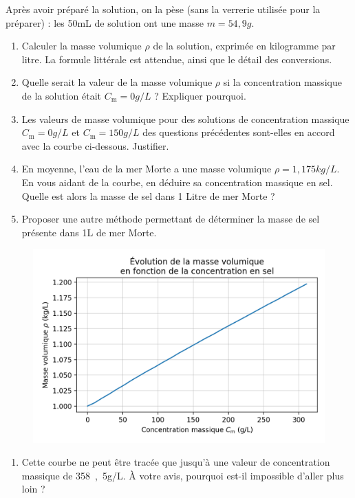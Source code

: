 Après avoir préparé la solution, on la pèse (sans la verrerie utilisée pour la préparer) : les \unit{50}{mL} de solution ont une masse $m=\unit{54{,}9}{g}$.
\begin{enumerate}[resume]
\item Calculer la masse volumique $\rho$ de la solution, exprimée en kilogramme par litre.
La formule littérale est attendue, ainsi que le détail des conversions.
\item Quelle serait la valeur de la masse volumique $\rho$ si la concentration massique de la solution était $C_\mathrm{m} = \unit{0}{g/L}$ ?
Expliquer pourquoi.
\item Les valeurs de masse volumique pour des solutions de concentration massique $C_\mathrm{m} = \unit{0}{g/L}$ et $C_\mathrm{m} = \unit{150}{g/L}$ des questions précédentes sont-elles en accord avec la courbe ci-dessous.
Justifier.
\item En moyenne, l'eau de la mer Morte a une masse volumique $\rho = \unit{1{,175}}{kg/L}$.
En vous aidant de la courbe, en déduire sa concentration massique en sel.
Quelle est alors la masse de sel dans 1 Litre de mer Morte ?
\item Proposer une autre méthode permettant de déterminer la masse de sel présente dans \unit{1}{L} de mer Morte.
\end{enumerate}
\begin{figure}[h]
\center
\includegraphics[scale=1]{../images/densite_saumure.png}
\end{figure}

\begin{enumerate}[resume]
\item Cette courbe ne peut être tracée que jusqu'à une valeur de concentration massique de \unit{358{,}5}{g/L}.
À votre avis, pourquoi est-il impossible d'aller plus loin ?
\end{enumerate}

